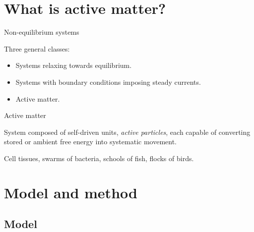 \documentclass{beamer}
\begin{document}
\section{What is active matter?}

\begin{frame}{Non-equilibrium systems}

Three general classes:
\begin{itemize}[<+->]
  \item Systems relaxing towards equilibrium.
  \item Systems with boundary conditions imposing steady currents.
  \item Active matter.
\end{itemize}


\end{frame}

\begin{frame}{Active matter}

\begin{definition}
System composed of self-driven units, \textit{active particles}, each capable of converting stored or ambient free energy into systematic movement.
\end{definition}
\pause
\begin{example}
Cell tissues, swarms of bacteria, schools of fish, flocks of birds.
\end{example}

\end{frame}

\section{Model and method}

\subsection{Model}
\end{document}
